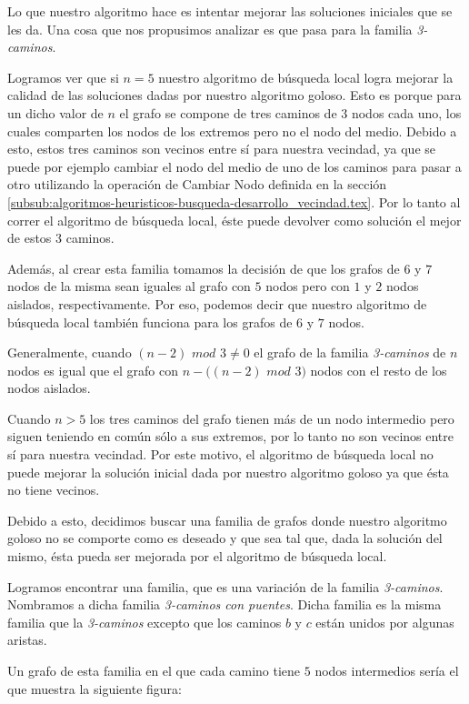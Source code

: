 Lo que nuestro algoritmo hace es intentar mejorar las soluciones iniciales que se les da. Una cosa que nos propusimos analizar es que pasa para la familia \emph{3-caminos}. 

Logramos ver que si $n = 5$ nuestro algoritmo de búsqueda local logra mejorar la calidad de las soluciones dadas por nuestro algoritmo goloso. Esto es porque para un dicho valor de $n$ el grafo se compone de tres caminos de $3$ nodos cada uno, los cuales comparten los nodos de los extremos pero no el nodo del medio. Debido a esto, estos tres caminos son vecinos entre sí para nuestra vecindad, ya que se puede por ejemplo cambiar el nodo del medio de uno de los caminos para pasar a otro utilizando la operación de Cambiar Nodo definida en la sección \ref{subsub:algoritmos-heuristicos-busqueda-desarrollo_vecindad.tex}. Por lo tanto al correr el algoritmo de búsqueda local, éste puede devolver como solución el mejor de estos $3$ caminos.

Además, al crear esta familia tomamos la decisión de que los grafos de $6$ y $7$ nodos de la misma sean iguales al grafo con $5$ nodos pero con $1$ y $2$ nodos aislados, respectivamente. Por eso, podemos decir que nuestro algoritmo de búsqueda local también funciona para los grafos de $6$ y $7$ nodos.

Generalmente, cuando $(n - 2)$ $mod$ $3 \neq 0$ el grafo de la familia \emph{3-caminos} de $n$ nodos es igual que el grafo con $n - ((n-2)$ $mod$ $3)$ nodos con el resto de los nodos aislados.

Cuando $n > 5$ los tres caminos del grafo tienen más de un nodo intermedio pero siguen teniendo en común sólo a sus extremos, por lo tanto no son vecinos entre sí para nuestra vecindad. Por este motivo, el algoritmo de búsqueda local no puede mejorar la solución inicial dada por nuestro algoritmo goloso ya que ésta no tiene vecinos.

Debido a esto, decidimos buscar una familia de grafos donde nuestro algoritmo goloso no se comporte como es deseado y que sea tal que, dada la solución del mismo, ésta pueda ser mejorada por el algoritmo de búsqueda local.

Logramos encontrar una familia, que es una variación de la familia \emph{3-caminos}. Nombramos a dicha familia \emph{3-caminos con puentes}. Dicha familia es la misma familia que la \emph{3-caminos} excepto que los caminos $b$ y $c$ están unidos por algunas aristas.

Un grafo de esta familia en el que cada camino tiene $5$ nodos intermedios sería el que muestra la siguiente figura:

